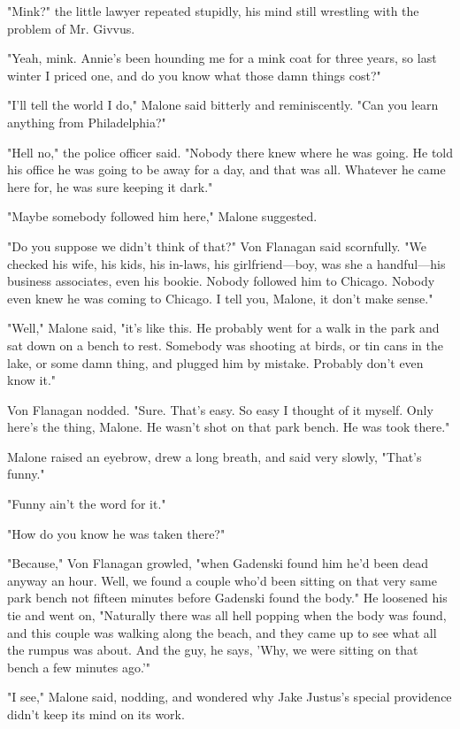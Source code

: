 \documentclass{novel}
\begin{document}
"Mink?" the little lawyer repeated stupidly, his mind still wrestling with the problem of Mr. Givvus.

"Yeah, mink. Annie's been hounding me for a mink coat for three years, so last winter I priced one, and do you know what those damn things cost?"

"I'll tell the world I do," Malone said bitterly and reminiscently. "Can you learn anything from Philadelphia?"

"Hell no," the police officer said. "Nobody there knew where he was going. He told his office he was going to be away for a day, and that was all. Whatever he came here for, he was sure keeping it dark."

"Maybe somebody followed him here," Malone suggested.

"Do you suppose we didn't think of that?" Von Flanagan said scornfully. "We checked his wife, his kids, his in-laws, his girlfriend—boy, was she a handful—his business associates, even his bookie. Nobody followed him to Chicago. Nobody even knew he was coming to Chicago. I tell you, Malone, it don't make sense."

"Well," Malone said, "it's like this. He probably went for a walk in the park and sat down on a bench to rest. Somebody was shooting at birds, or tin cans in the lake, or some damn thing, and plugged him by mistake. Probably don't even know it."

Von Flanagan nodded. "Sure. That's easy. So easy I thought of it myself. Only here's the thing, Malone. He wasn't shot on that park bench. He was took there."

Malone raised an eyebrow, drew a long breath, and said very slowly, "That's funny."

"Funny ain't the word for it."

"How do you know he was taken there?"

"Because," Von Flanagan growled, "when Gadenski found him he'd been dead anyway an hour. Well, we found a couple who'd been sitting on that very same park bench not fifteen minutes before Gadenski found the body." He loosened his tie and went on, "Naturally there was all hell popping when the body was found, and this couple was walking along the beach, and they came up to see what all the rumpus was about. And the guy, he says, 'Why, we were sitting on that bench a few minutes ago.'"

"I see," Malone said, nodding, and wondered why Jake Justus's special providence didn't keep its mind on its work.
\end{document}
